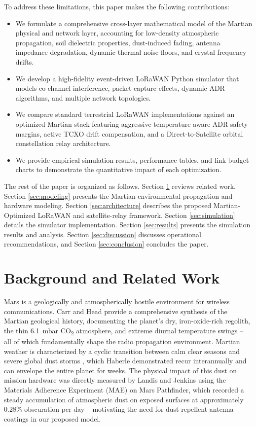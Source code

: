 \documentclass[journal,10pt,doublecolumn]{IEEEtran}
\begin{document}
To address these limitations, this paper makes the following contributions:
\begin{itemize}
    \item We formulate a comprehensive cross-layer mathematical model of the Martian physical and network layer, accounting for low-density atmospheric propagation, soil dielectric properties, dust-induced fading, antenna impedance degradation, dynamic thermal noise floors, and crystal frequency drifts.
    \item We develop a high-fidelity event-driven LoRaWAN Python simulator that models co-channel interference, packet capture effects, dynamic ADR algorithms, and multiple network topologies.
    \item We compare standard terrestrial LoRaWAN implementations against an optimized Martian stack featuring aggressive temperature-aware ADR safety margins, active TCXO drift compensation, and a Direct-to-Satellite orbital constellation relay architecture.
    \item We provide empirical simulation results, performance tables, and link budget charts to demonstrate the quantitative impact of each optimization.
\end{itemize}

The rest of the paper is organized as follows. Section \ref{sec:related} reviews related work. Section \ref{sec:modeling} presents the Martian environmental propagation and hardware modeling. Section \ref{sec:architecture} describes the proposed Martian-Optimized LoRaWAN and satellite-relay framework. Section \ref{sec:simulation} details the simulator implementation. Section \ref{sec:results} presents the simulation results and analysis. Section \ref{sec:discussion} discusses operational recommendations, and Section \ref{sec:conclusion} concludes the paper.

\section{Background and Related Work}
\label{sec:related}
Mars is a geologically and atmospherically hostile environment for wireless communications. Carr and Head \cite{carr2010mars} provide a comprehensive synthesis of the Martian geological history, documenting the planet's dry, iron-oxide-rich regolith, the thin 6.1~mbar CO\textsubscript{2} atmosphere, and extreme diurnal temperature swings -- all of which fundamentally shape the radio propagation environment. Martian weather is characterized by a cyclic transition between calm clear seasons and severe global dust storms \cite{haberle1986dust}, which Haberle demonstrated recur interannually and can envelope the entire planet for weeks. The physical impact of this dust on mission hardware was directly measured by Landis and Jenkins \cite{landis2000dust} using the Materials Adherence Experiment (MAE) on Mars Pathfinder, which recorded a steady accumulation of atmospheric dust on exposed surfaces at approximately 0.28\% obscuration per day -- motivating the need for dust-repellent antenna coatings in our proposed model.
\end{document}
